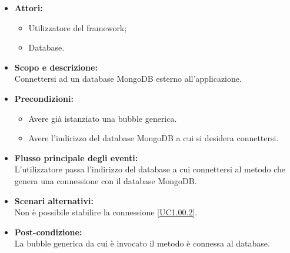 \begin{itemize}
\item \textbf{Attori:}
\begin{itemize}
	\item Utilizzatore del framework;
	\item Database.
\end{itemize}
\item \textbf{Scopo e descrizione:} 
\\Connettersi ad un database MongoDB esterno all'applicazione.
\item \textbf{Precondizioni:}
	\begin{itemize}
		\item Avere già istanziato una bubble generica.
		\item Avere l'indirizzo del database MongoDB a cui si desidera connettersi.
	\end{itemize}
\item \textbf{Flusso principale degli eventi:}
\\L'utilizzatore passa l'indirizzo del database a cui connettersi al metodo che genera una connessione con il database MongoDB.
\item \textbf{Scenari alternativi:}
\\Non è possibile stabilire la connessione \ref{UC1.00.2}.
\item \textbf{Post-condizione:}
\\La bubble generica da cui è invocato il metodo è connessa al database.
\end{itemize}

